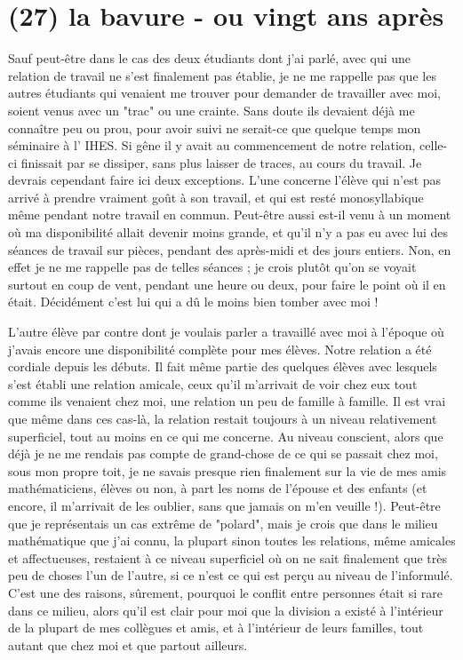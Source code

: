 \section{(27) la bavure - ou vingt ans après}

Sauf peut-être dans le cas des deux étudiants dont j’ai parlé, avec qui une relation de travail ne s'est finalement pas établie, je ne me rappelle pas que les autres étudiants qui venaient me trouver pour demander de travailler avec moi, soient venus avec un "trac" ou une crainte. Sans doute ils devaient déjà me connaître peu ou prou, pour avoir suivi ne serait-ce que quelque temps mon séminaire à l' IHES. Si gêne il y avait au commencement de notre relation, celle-ci finissait par se dissiper, sans plus laisser de traces, au cours du travail. Je devrais cependant faire ici deux exceptions. L'une concerne l'élève qui n'est pas arrivé à prendre vraiment goût à son travail, et qui est resté monosyllabique même pendant notre travail en commun. Peut-être aussi est-il venu à un moment où ma disponibilité allait devenir moins grande, et qu'il n'y a pas eu avec lui des séances de travail sur pièces, pendant des après-midi et des jours entiers. Non, en effet je ne me rappelle pas de telles séances ; je crois plutôt qu'on se voyait surtout en coup de vent, pendant une heure ou deux, pour faire le point où il en était. Décidément c'est lui qui a dû le moins bien tomber avec moi !

L'autre élève par contre dont je voulais parler a travaillé avec moi à l'époque où j'avais encore une disponibilité complète pour mes élèves. Notre relation a été cordiale depuis les débuts. Il fait même partie des quelques élèves avec lesquels s'est établi une relation amicale, ceux qu'il m'arrivait de voir chez eux tout comme ils venaient chez moi, une relation un peu de famille à famille. Il est vrai que même dans ces cas-là, la relation restait toujours à un niveau relativement superficiel, tout au moins en ce qui me concerne. Au niveau conscient, alors que déjà je ne me rendais pas compte de grand-chose de ce qui se passait chez moi, sous mon propre toit, je ne savais presque rien finalement sur la vie de mes amis mathématiciens, élèves ou non, à part les noms de l'épouse et des enfants (et encore, il m'arrivait de les oublier, sans que jamais on m'en veuille !). Peut-être que je représentais un cas extrême de "polard", mais je crois que dans le milieu mathématique que j'ai connu, la plupart sinon toutes les relations, même amicales et affectueuses, restaient à ce niveau superficiel où on ne sait finalement que très peu de choses l'un de l'autre, si ce n'est ce qui est perçu au niveau de l'informulé. C'est une des raisons, sûrement, pourquoi le conflit entre personnes était si rare dans ce milieu, alors qu'il est clair pour moi que la division a existé à l'intérieur de la plupart de mes collègues et amis, et à l'intérieur de leurs familles, tout autant que chez moi et que partout ailleurs.

